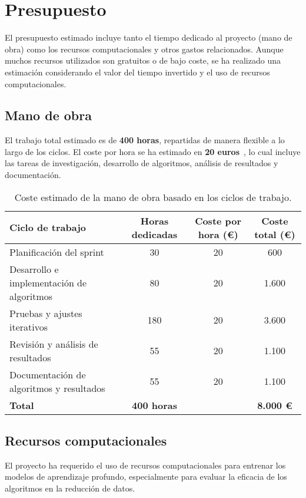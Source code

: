 \section{Presupuesto}\label{sec:presupuesto}
El presupuesto estimado incluye tanto el tiempo dedicado al proyecto (mano de obra) como los recursos computacionales y
otros gastos relacionados.
Aunque muchos recursos utilizados son gratuitos o de bajo coste, se ha realizado una estimación considerando el valor
del tiempo invertido y el uso de recursos computacionales.

\subsection{Mano de obra}\label{subsec:mano-de-obra}
El trabajo total estimado es de \textbf{400 horas}, repartidas de manera flexible a lo largo de los ciclos.
El coste por hora se ha estimado en \textbf{20 euros}~\cite{salario-medio}, lo cual incluye las tareas de investigación, desarrollo de
algoritmos, análisis de resultados y documentación.

\begin{table}[htp]\label{tab:mano-de-obra}
    \centering
    \begin{adjustbox}{width=\linewidth}
        \begin{tabular}{|l|c|c|c|}
            \hline
            \textbf{Ciclo de trabajo} & \textbf{Horas dedicadas} & \textbf{Coste por hora (€)} & \textbf{Coste total (€)} \\ \hline
            Planificación del sprint & 30 & 20 & 600 \\
            Desarrollo e implementación de algoritmos & 80 & 20 & 1.600 \\
            Pruebas y ajustes iterativos & 180 & 20 & 3.600 \\
            Revisión y análisis de resultados & 55 & 20 & 1.100 \\
            Documentación de algoritmos y resultados & 55 & 20 & 1.100 \\ \hline
            \textbf{Total} & \textbf{400 horas} & & \textbf{8.000 €} \\ \hline
        \end{tabular}
    \end{adjustbox}
    \caption{Coste estimado de la mano de obra basado en los ciclos de trabajo.}
\end{table}



\subsection{Recursos computacionales}\label{subsec:recursos-computacionales}
El proyecto ha requerido el uso de recursos computacionales para entrenar los modelos de aprendizaje profundo,
especialmente para evaluar la eficacia de los algoritmos en la reducción de datos. \\[6pt]


